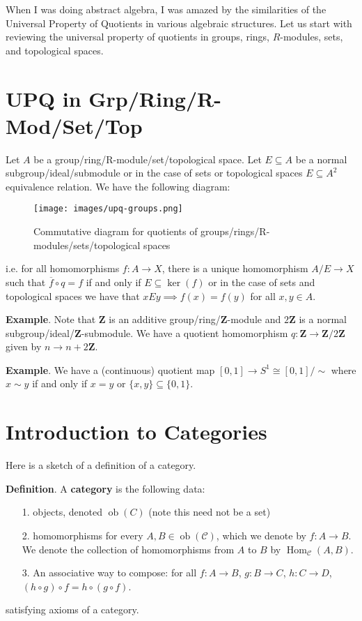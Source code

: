 \documentclass{article}
\begin{document}
When I was doing abstract algebra, I was amazed by the similarities of the Universal Property of Quotients in various algebraic structures. Let us start with reviewing the universal property of quotients in groups, rings, \(R\)-modules, sets, and topological spaces.

\chapter{UPQ in Grp/Ring/R-Mod/Set/Top}

Let \(A\) be a group/ring/R-module/set/topological space. Let \(E \subseteq A\) be a normal subgroup/ideal/submodule or in the case of sets or topological spaces \(E \subseteq A^2\) equivalence relation. We have the following diagram:

\begin{figure}
\centering
\texttt{[image: images/upq-groups.png]}
\caption{Commutative diagram for quotients of groups/rings/R-modules/sets/topological spaces}
\end{figure}


i.e. for all homomorphisms \(f : A \to X\),  there is a unique homomorphism \(A/E \to X\) such that \(\overline{f} \circ q = f\) if and only if \(E \subseteq \operatorname{ker}(f)\) or in the case of sets and topological spaces we have that \(x E y \implies f(x) = f(y)\) for all \(x,y \in A\).

\textbf{Example}. Note that \(\mathbf{Z}\) is an additive group/ring/\(\mathbf{Z}\)-module and \(2\mathbf{Z}\) is a normal subgroup/ideal/\(\mathbf{Z}\)-submodule. We have a quotient homomorphism \(q : \mathbf{Z} \to \mathbf{Z}/2\mathbf{Z}\) given by \(n \to n + 2\mathbf{Z}\).

\textbf{Example}. We have a (continuous) quotient map \([0,1] \to S^{1} \cong [0,1]/\sim\) where \(x \sim y\) if and only if \(x = y\) or \(\{x,y\} \subseteq \{0,1\}\).

\chapter{Introduction to Categories}

Here is a sketch of a definition of a category.

\textbf{Definition}. A \textbf{category} is the following data:

\begin{itemize}
\item[1. ] objects, denoted \(\operatorname{ob}(C)\) (note this need not be a set)


\item[2. ] homomorphisms for every \(A,B \in \operatorname{ob}(\mathcal{C})\), which we denote by \(f : A \to B\). We denote the collection of homomorphisms from \(A\) to \(B\) by \(\operatorname{Hom}_{\mathcal{C}}(A,B)\).


\item[3. ] An associative way to compose: for all \(f : A \to B\), \(g : B \to C\), \(h : C \to D\), \((h \circ g) \circ f = h \circ (g \circ f)\).

\end{itemize}
satisfying axioms of a category.
\end{document}
